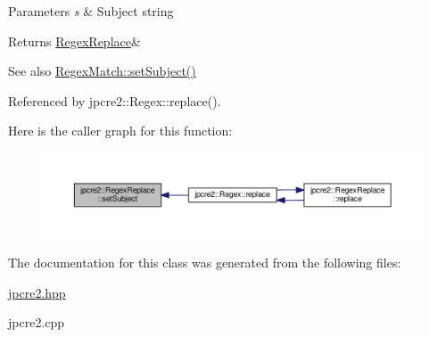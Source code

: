 \begin{DoxyParams}{Parameters}
{\em s} & Subject string \\
\hline
\end{DoxyParams}
\begin{DoxyReturn}{Returns}
\hyperlink{classjpcre2_1_1RegexReplace}{Regex\+Replace}\& 
\end{DoxyReturn}
\begin{DoxySeeAlso}{See also}
\hyperlink{classjpcre2_1_1RegexMatch_a635c652195deaa8ebb9e107c4f972aab}{Regex\+Match\+::set\+Subject()} 
\end{DoxySeeAlso}


Referenced by jpcre2\+::\+Regex\+::replace().



Here is the caller graph for this function\+:\nopagebreak
\begin{figure}[H]
\begin{center}
\leavevmode
\includegraphics[width=350pt]{classjpcre2_1_1RegexReplace_a46eefdb105827920bebc8436721fa4cb_icgraph}
\end{center}
\end{figure}




The documentation for this class was generated from the following files\+:\begin{DoxyCompactItemize}
\item 
\hyperlink{jpcre2_8hpp}{jpcre2.\+hpp}\item 
jpcre2.\+cpp\end{DoxyCompactItemize}

